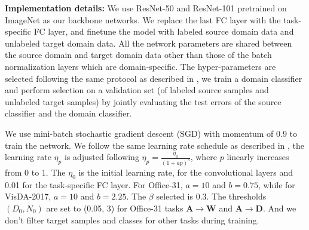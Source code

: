 \documentclass[10pt,twocolumn,letterpaper]{article}
\begin{document}
\noindent\textbf{Implementation details:} We use ResNet-50 and ResNet-101 \cite{he2016deep,he2016identity} pretrained on ImageNet \cite{deng2009imagenet} as our backbone networks. 
We replace the last FC layer with the task-specific FC layer,
and finetune the model with labeled source domain data and unlabeled target domain data.
All the network parameters are shared between the source domain and target domain data
other than those of the batch normalization layers which are domain-specific.
The hyper-parameters are selected following the same protocol as described in \cite{long2015learning}, \ie we train a domain classifier and perform selection on a validation set (of labeled source samples and unlabeled target samples)
by jointly evaluating the test errors of the source classifier and the domain classifier. 

We use mini-batch stochastic gradient descent (SGD) 
with momentum of 0.9 to train the network. 
We follow the same learning rate schedule as described in \cite{ganin2014unsupervised,long2015learning,long2017deep}, \ie the learning rate $\eta_p$ is adjusted following $\eta_p = \frac{\eta_0}{(1+ap)^b}$, 
where $p$ linearly increases from 0 to 1. The $\eta_0$ is the initial learning rate,
 for the convolutional layers and 0.01 for the task-specific FC layer.  
For Office-31, $a = 10$ and $b = 0.75$,
while for VisDA-2017, $a = 10$ and $b = 2.25$.
The $\beta$ selected is 0.3.
The thresholds $(D_0, N_0)$ are set to (0.05, 3) for Office-31 tasks 
\textbf{A}$\rightarrow$\textbf{W} and \textbf{A}$\rightarrow$\textbf{D}.
And we don't filter target samples and classes for other tasks during training.
\end{document}
